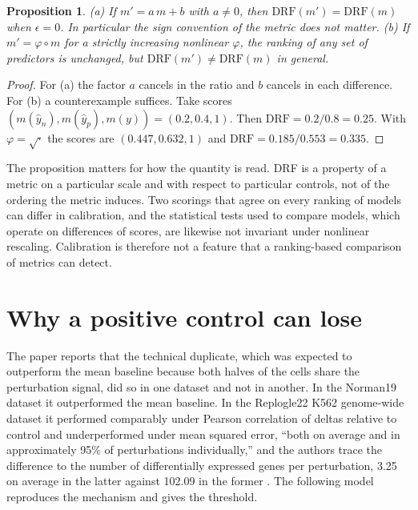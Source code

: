 \documentclass[11pt]{article}
\newtheorem{proposition}{Proposition}
\theoremstyle{definition}
\newcommand{\DRF}{\mathrm{DRF}}
\begin{document}
\begin{proposition}
(a) If $m'=a\,m+b$ with $a\neq0$, then $\DRF(m')=\DRF(m)$ when $\epsilon=0$. In particular the sign convention of the metric does not matter. (b) If $m'=\varphi\circ m$ for a strictly increasing nonlinear $\varphi$, the ranking of any set of predictors is unchanged, but $\DRF(m')\neq\DRF(m)$ in general.
\end{proposition}

\begin{proof}
For (a) the factor $a$ cancels in the ratio and $b$ cancels in each difference. For (b) a counterexample suffices. Take scores $(m(\hat y_n),m(\hat y_p),m(y))=(0.2,0.4,1)$. Then $\DRF=0.2/0.8=0.25$. With $\varphi=\sqrt{\cdot}$ the scores are $(0.447,0.632,1)$ and $\DRF=0.185/0.553=0.335$. \qedhere
\end{proof}

The proposition matters for how the quantity is read. DRF is a property of a metric on a particular scale and with respect to particular controls, not of the ordering the metric induces. Two scorings that agree on every ranking of models can differ in calibration, and the statistical tests used to compare models, which operate on differences of scores, are likewise not invariant under nonlinear rescaling. Calibration is therefore not a feature that a ranking-based comparison of metrics can detect.

\section{Why a positive control can lose}

The paper reports that the technical duplicate, which was expected to outperform the mean baseline because both halves of the cells share the perturbation signal, did so in one dataset and not in another. In the Norman19 dataset it outperformed the mean baseline. In the Replogle22 K562 genome-wide dataset it performed comparably under Pearson correlation of deltas relative to control and underperformed under mean squared error, ``both on average and in approximately 95\% of perturbations individually,'' and the authors trace the difference to the number of differentially expressed genes per perturbation, 3.25 on average in the latter against 102.09 in the former \citep{miller2026}. The following model reproduces the mechanism and gives the threshold.
\end{document}
